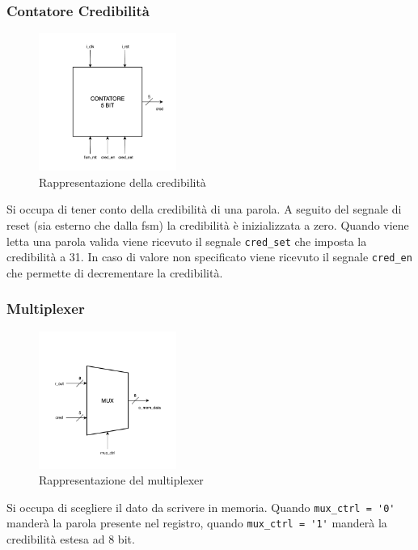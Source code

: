 \newpage

\subsubsection{Contatore Credibilità}
\begin{figure}[H]
    \centering
    \includegraphics[width=0.4\textwidth]{figures/credibility.png}
    \caption{Rappresentazione della credibilità}
    \label{fig:credibility}
\end{figure}

Si occupa di tener conto della credibilità di una parola. A seguito del segnale di reset (sia esterno che dalla fsm) la credibilità è inizializzata a zero. Quando viene letta una parola valida viene ricevuto il segnale \lstinline[columns=fixed]{cred_set} che imposta la credibilità a 31. In caso di valore non specificato viene ricevuto il segnale \lstinline[columns=fixed]{cred_en} che permette di decrementare la credibilità.

\subsubsection{Multiplexer}
\begin{figure}[H]
    \centering
    \includegraphics[width=0.4\textwidth]{figures/mux.png}
    \caption{Rappresentazione del multiplexer}
    \label{fig:mux}
\end{figure}

Si occupa di scegliere il dato da scrivere in memoria. Quando \lstinline[columns=fixed]{mux_ctrl = '0'} manderà la parola presente nel registro, quando  \lstinline[columns=fixed]{mux_ctrl = '1'} manderà la credibilità estesa ad 8 bit.

